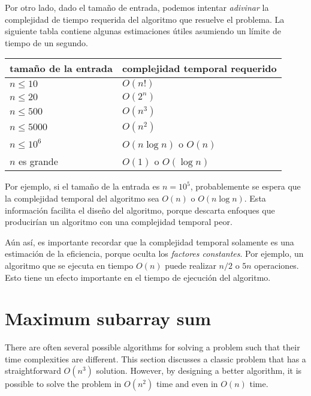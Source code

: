 Por otro lado, dado el tamaño de entrada,
podemos intentar \emph{adivinar}
la complejidad de tiempo requerida del algoritmo
que resuelve el problema.
La siguiente tabla contiene algunas estimaciones útiles
asumiendo un límite de tiempo de un segundo.

\begin{center}
\begin{tabular}{ll}
tamaño de la entrada & complejidad temporal requerido \\
\hline
$n \le 10$ & $O(n!)$ \\
$n \le 20$ & $O(2^n)$ \\
$n \le 500$ & $O(n^3)$ \\
$n \le 5000$ & $O(n^2)$ \\
$n \le 10^6$ & $O(n \log n)$ o $O(n)$ \\
$n$ es grande & $O(1)$ o $O(\log n)$ \\
\end{tabular}
\end{center}

Por ejemplo, si el tamaño de la entrada es $n=10^5$,
probablemente se espera que la complejidad
temporal del algoritmo sea $O(n)$ o $O(n \log n)$.
Esta información facilita el diseño del algoritmo,
porque descarta enfoques que producirían
un algoritmo con una complejidad temporal peor.


Aún así, es importante recordar que
la complejidad temporal solamente es una estimación de la eficiencia,
porque oculta los \emph{factores constantes}.
Por ejemplo, un algoritmo que se ejecuta en tiempo $O(n)$
puede realizar $n/2$ o $5n$ operaciones.
Esto tiene un efecto importante en el
tiempo de ejecución del algoritmo.

\section{Maximum subarray sum}


There are often several possible algorithms
for solving a problem such that their
time complexities are different.
This section discusses a classic problem that
has a straightforward $O(n^3)$ solution.
However, by designing a better algorithm, it
is possible to solve the problem in $O(n^2)$
time and even in $O(n)$ time.

